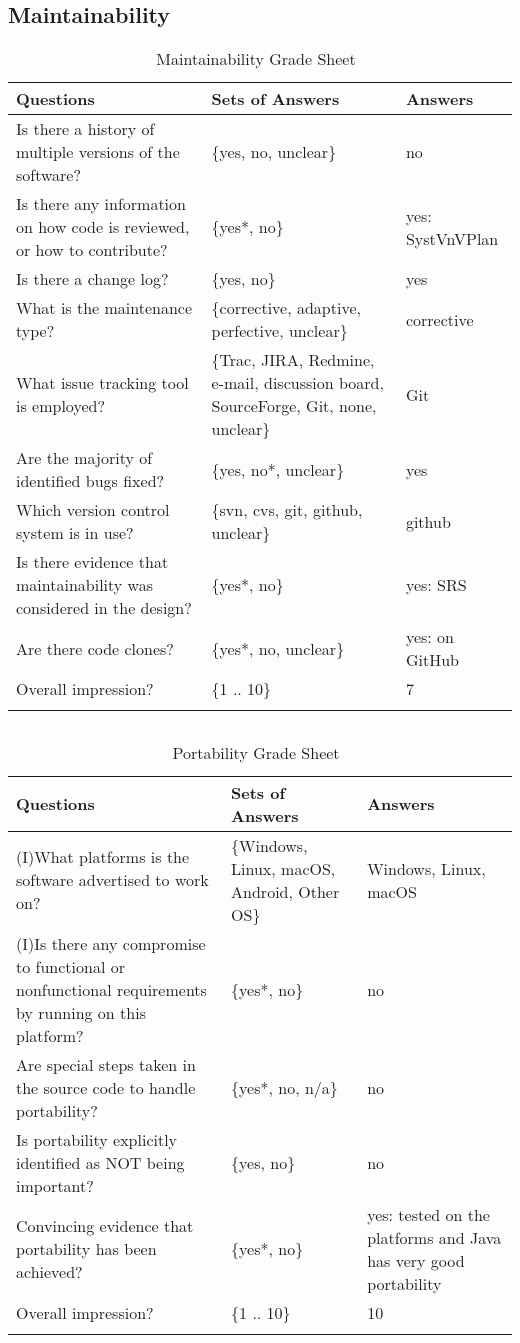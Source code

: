 \documentclass[12pt, titlepage]{article}
\begin{document}
\subsection{Maintainability}

\begin{longtable}{p{7cm} p{4cm} l}
\hline Questions & Sets of Answers & Answers \\ \hline
Is there a history of multiple versions of the software? & \{yes, no, unclear\}
& no\\
Is there any information on how code is reviewed, or how to contribute? &
\{yes*, no\} & yes: SystVnVPlan \cite{Dong2019SystVnV}\\
Is there a change log? & \{yes, no\} & yes\\
What is the maintenance type? & \{corrective, adaptive, perfective, unclear\}&
corrective\\
What issue tracking tool is employed? & \{Trac, JIRA, Redmine, e-mail,
discussion board, SourceForge, Git, none, unclear\}& Git\\
Are the majority of identified bugs fixed? & \{yes, no*, unclear\} & yes\\
Which version control system is in use? & \{svn, cvs, git, github, unclear\} &
github\\
Is there evidence that maintainability was considered in the design? & \{yes*,
no\} & yes: SRS \cite{Dong2019SRS}\\
Are there code clones? & \{yes*, no, unclear\} & yes: on GitHub \\
Overall impression? & \{1 .. 10\} & 7\\ \hline
\caption{Maintainability Grade Sheet~\cite{SmithEtAl2018}}
\label{Tb_maintainability}
\end{longtable}

\subsection{}

\begin{longtable}{p{7cm} p{4cm} p{4cm}}
\toprule
Questions & Sets of Answers & Answers\\ \midrule

(I)What platforms is the software advertised to work on?
& \{Windows, Linux, macOS, Android, Other
OS\} & Windows, Linux, macOS\\
(I)Is there any compromise to functional or nonfunctional requirements by
running on this platform? &
\{yes*, no\} & no\\Are special steps taken in the source code to handle
portability?& \{yes*, no,
n/a\} & no\\
Is portability explicitly identified as NOT being important? & \{yes, no\} &
no\\
Convincing evidence that portability has been achieved? & \{yes*, no\} & yes:
tested on the platforms and Java has very good portability\\
Overall impression? & \{1 .. 10\} & 10\\ \bottomrule
\caption{Portability Grade Sheet~\cite{SmithEtAl2018}}
\label{Tb_portability}
\end{longtable}
\end{document}

